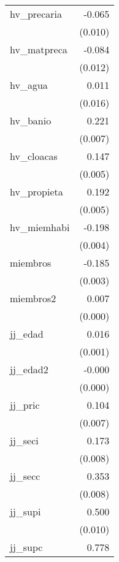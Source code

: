 {\begin{longtable}{l*{1}{D{.}{.}{-1}}}
hv\_precaria &      -0.065\sym{***}\\
            &     (0.010)         \\
\addlinespace
hv\_matpreca &      -0.084\sym{***}\\
            &     (0.012)         \\
\addlinespace
hv\_agua     &       0.011         \\
            &     (0.016)         \\
\addlinespace
hv\_banio    &       0.221\sym{***}\\
            &     (0.007)         \\
\addlinespace
hv\_cloacas  &       0.147\sym{***}\\
            &     (0.005)         \\
\addlinespace
hv\_propieta &       0.192\sym{***}\\
            &     (0.005)         \\
\addlinespace
hv\_miemhabi &      -0.198\sym{***}\\
            &     (0.004)         \\
\addlinespace
miembros    &      -0.185\sym{***}\\
            &     (0.003)         \\
\addlinespace
miembros2   &       0.007\sym{***}\\
            &     (0.000)         \\
\addlinespace
jj\_edad     &       0.016\sym{***}\\
            &     (0.001)         \\
\addlinespace
jj\_edad2    &      -0.000\sym{***}\\
            &     (0.000)         \\
\addlinespace
jj\_pric     &       0.104\sym{***}\\
            &     (0.007)         \\
\addlinespace
jj\_seci     &       0.173\sym{***}\\
            &     (0.008)         \\
\addlinespace
jj\_secc     &       0.353\sym{***}\\
            &     (0.008)         \\
\addlinespace
jj\_supi     &       0.500\sym{***}\\
            &     (0.010)         \\
\addlinespace
jj\_supc     &       0.778\sym{***}\\

\end{longtable}}
